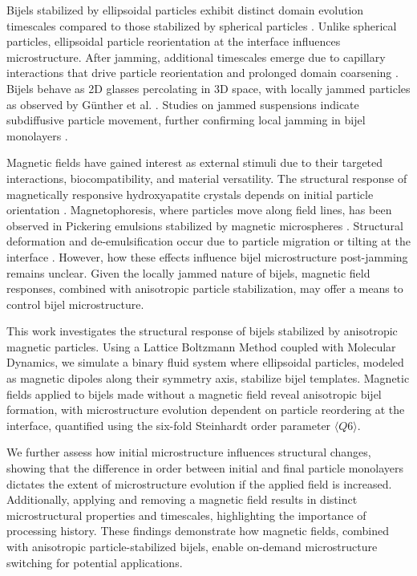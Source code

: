 Bijels stabilized by ellipsoidal particles exhibit distinct domain evolution timescales compared to those stabilized by 
spherical particles \cite{gunther_timescales_2014}. Unlike spherical particles, ellipsoidal particle reorientation at the 
interface influences microstructure. After jamming, additional timescales emerge due to capillary interactions that drive 
particle reorientation and prolonged domain coarsening \cite{gunther_timescales_2014}. Bijels behave as 2D glasses percolating 
in 3D space, with locally jammed particles as observed by Günther et al. 
\cite{ching_bijel_2022, torquato_jammed_2010, gunther_timescales_2014}. Studies on jammed suspensions indicate subdiffusive 
particle movement, further confirming local jamming in bijel monolayers \cite{savelev_diffusion_2006}.

Magnetic fields have gained interest as external stimuli due to their targeted interactions, biocompatibility, and material 
versatility. The structural response of magnetically responsive hydroxyapatite crystals depends on initial particle orientation
\cite{nakayama_stimuli-responsive_2018}. Magnetophoresis, where particles move along field lines, has been observed in Pickering 
emulsions stabilized by magnetic microspheres \cite{tham_magnetophoresis_2021}. Structural deformation and de-emulsification occur due 
to particle migration or tilting at the interface \cite{yang_rapid_2020, misra_magnetic_2020}. However, how these effects influence 
bijel microstructure post-jamming remains unclear. Given the locally jammed nature of bijels, magnetic field responses, combined with 
anisotropic particle stabilization, may offer a means to control bijel microstructure.

This work investigates the structural response of bijels stabilized by anisotropic magnetic particles. Using a Lattice Boltzmann Method 
coupled with Molecular Dynamics, we simulate a binary fluid system where ellipsoidal particles, modeled as magnetic dipoles along their 
symmetry axis, stabilize bijel templates. Magnetic fields applied to bijels made without a magnetic field reveal anisotropic bijel formation, 
with microstructure evolution dependent on particle reordering at the interface, quantified using the six-fold 
Steinhardt order parameter \(\langle Q6 \rangle\).

We further assess how initial microstructure influences structural changes, showing that the difference in order between initial and final 
particle monolayers dictates the extent of microstructure evolution if the applied field is increased. Additionally, applying and removing a 
magnetic field results in distinct microstructural properties and timescales, highlighting the importance of processing history. These findings 
demonstrate how magnetic fields, combined with anisotropic particle-stabilized bijels, enable on-demand microstructure switching for potential applications.

